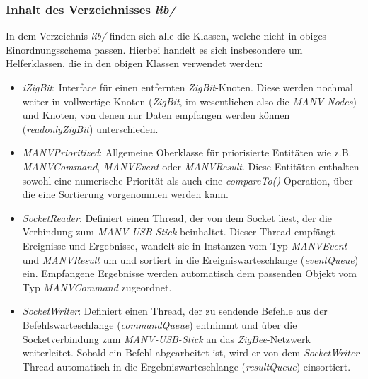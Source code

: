     \subsubsection{Inhalt des Verzeichnisses \emph{lib/}}

    In dem Verzeichnis \emph{lib/} finden sich alle die Klassen, welche nicht in obiges Einordnungsschema passen. 
    Hierbei handelt es sich insbesondere um Helferklassen, die in den obigen Klassen verwendet werden:

    \begin{itemize}
        \item{\emph{iZigBit}:} Interface für einen entfernten \emph{ZigBit}-Knoten. Diese werden nochmal weiter
                        in vollwertige Knoten (\emph{ZigBit}, im wesentlichen also die \emph{MANV-Nodes})
                        und Knoten, von denen nur Daten empfangen werden können (\emph{readonlyZigBit})
                        unterschieden.
        \item{\emph{MANVPrioritized}:} Allgemeine Oberklasse für priorisierte Entitäten wie z.B.\\ \emph{MA\-NV\-Command},
                                \emph{MANVEvent} oder \emph{MANVResult}. Diese Entitäten enthalten 
                                sowohl eine numerische Priorität als auch eine \emph{compareTo()}-Operation,
                                über die eine Sortierung vorgenommen werden kann.
        \item{\emph{SocketReader}:} Definiert einen Thread, der von dem Socket liest, der die Verbindung zum 
                                    \emph{MANV-USB-Stick} beinhaltet. Dieser Thread empfängt Ereignisse und 
                                    Ergebnisse, wandelt sie in Instanzen vom Typ \emph{MANVEvent} und 
                                    \emph{MANVResult} um und sortiert
                             in die Ereigniswarteschlange (\emph{eventQueue}) ein. Empfangene Ergebnisse werden
                             automatisch dem passenden Objekt vom Typ \emph{MANVCommand} zugeordnet.
        \item{\emph{SocketWriter}:} Definiert einen Thread, der zu sendende Befehle aus der Befehlswarteschlange
                             (\emph{commandQueue}) entnimmt und über die Socketverbindung zum \emph{MANV-USB-Stick}
                             an das \emph{ZigBee}-Netzwerk weiterleitet. Sobald ein Befehl abgearbeitet ist,
                             wird er von dem \emph{SocketWriter}-Thread automatisch in die Ergebniswarteschlange 
                             (\emph{resultQueue}) einsortiert.
    \end{itemize}


